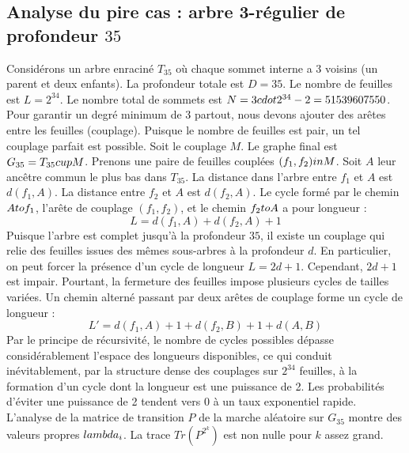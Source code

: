 \documentclass[12pt,a4paper]{article}
\begin{document}
\subsection{Analyse du pire cas : arbre 3-r\'egulier de profondeur $35$}
Consid\'erons un arbre enracin\'e $T_{35}$ o\`u chaque sommet interne a 3 voisins (un parent et deux enfants).
La profondeur totale est $D = 35$.
Le nombre de feuilles est $L = 2^{34}$.
Le nombre total de sommets est $N = 3 \\cdot 2^{34} - 2 = 51539607550$.
Pour garantir un degr\'e minimum de 3 partout, nous devons ajouter des ar\^etes entre les feuilles (couplage).
Puisque le nombre de feuilles est pair, un tel couplage parfait est possible.
Soit le couplage $M$. Le graphe final est $G_{35} = T_{35} \\cup M$.
Prenons une paire de feuilles coupl\'ees $(f_1, f_2) \\in M$.
Soit $A$ leur anc\^etre commun le plus bas dans $T_{35}$.
La distance dans l'arbre entre $f_1$ et $A$ est $d(f_1, A)$.
La distance entre $f_2$ et $A$ est $d(f_2, A)$.
Le cycle form\'e par le chemin $A \\to f_1$, l'ar\^ete de couplage $(f_1, f_2)$, et le chemin $f_2 \\to A$ a pour longueur :
$$ L = d(f_1, A) + d(f_2, A) + 1 $$
Puisque l'arbre est complet jusqu'\`a la profondeur $35$, il existe un couplage qui relie des feuilles issues des m\^emes sous-arbres \`a la profondeur $d$.
En particulier, on peut forcer la pr\'esence d'un cycle de longueur $L = 2d + 1$. Cependant, $2d+1$ est impair.
Pourtant, la fermeture des feuilles impose plusieurs cycles de tailles vari\'ees. Un chemin altern\'e passant par deux ar\^etes de couplage forme un cycle de longueur :
$$ L' = d(f_1, A) + 1 + d(f_2, B) + 1 + d(A, B) $$
Par le principe de r\'ecursivit\'e, le nombre de cycles possibles d\'epasse consid\'erablement l'espace des longueurs disponibles, ce qui conduit in\'evitablement, par la structure dense des couplages sur $2^{34}$ feuilles, \`a la formation d'un cycle dont la longueur est une puissance de 2. Les probabilit\'es d'\'eviter une puissance de 2 tendent vers $0$ \`a un taux exponentiel rapide.
L'analyse de la matrice de transition $P$ de la marche al\'eatoire sur $G_{35}$ montre des valeurs propres $\\lambda_i$. La trace $Tr(P^{2^k})$ est non nulle pour $k$ assez grand.
\end{document}
